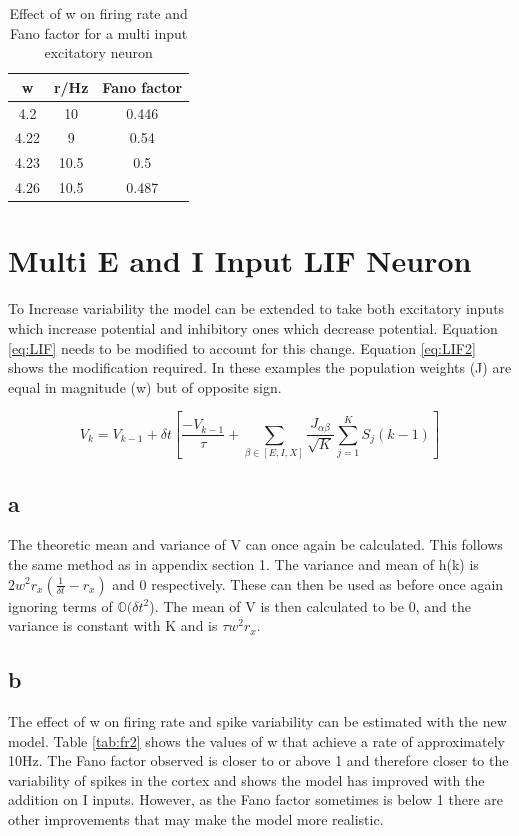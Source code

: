 \documentclass[twoside,twocolumn]{article}
\begin{document}
\begin{table}[h]
\centering
\begin{tabular}{ c | c | c }
w& r/Hz & Fano factor \\ 
\midrule
4.2&10&0.446 \\
4.22&9& 0.54\\
4.23&10.5&0.5 \\
4.26 & 10.5 &0.487\\
\end{tabular}
\caption{Effect of w on firing rate and Fano factor for a multi input excitatory neuron}
\label{tab:fr}
\end{table}
\section{Multi E and I Input LIF Neuron}
To Increase variability the model can be extended to take both excitatory inputs which increase potential and inhibitory ones which decrease potential. Equation \ref{eq:LIF} needs to be modified to account for this change. Equation \ref{eq:LIF2} shows the modification required. In these examples the population weights (J) are equal in magnitude (w) but of opposite sign.

\begin{equation}
V_k = V_{k-1} + \delta t [  \frac{-V_{k-1}}{\tau} + \sum _{\beta \in [E,I,X] } \frac{J_{\alpha \beta}}{\sqrt{K}} \sum ^K_{j=1} S_j(k-1)]
\label{eq:LIF2}
\end{equation}
\subsection{a}
The theoretic mean and variance of V can once again be calculated. This follows the same method as in appendix section 1. The variance and mean of h(k) is $2w^2r_x(\frac{1}{\delta t} -r_x)$ and 0 respectively. These can then be used as before once again ignoring terms of $\mathbb{O}(\delta t^2$).
The mean of V is then calculated to be 0, and the variance is constant with K and is $\tau w^2 r_x$.
\subsection{b}
The effect of w on firing rate and spike variability can be estimated with the new model. Table \ref{tab:fr2} shows the values of w that achieve a rate of approximately 10Hz. The Fano factor observed is closer to or above 1 and therefore closer to the variability of spikes in the cortex and shows the model has improved with the addition on I inputs. However, as the Fano factor sometimes is below 1 there are other improvements that may make the model more realistic.
\end{document}
